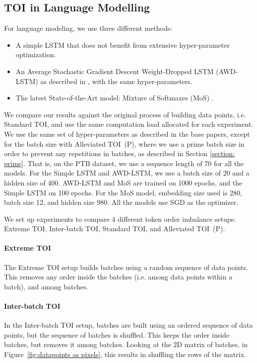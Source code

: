 \documentclass[11pt,a4paper]{article}
\begin{document}
\subsection{TOI in Language Modelling}

For language modeling, we use three different methods:
\begin{itemize}
    \item A simple LSTM that does not benefit from extensive hyper-parameter optimization.
    \item An Average Stochastic Gradient Descent Weight-Dropped LSTM (AWD-LSTM) as described in \citet{Merity:17}, with the same hyper-parameters.
    \item The latest State-of-the-Art model: Mixture of Softmaxes (MoS) \cite{Zhilin:17}.
\end{itemize} 
We compare our results against the original process of building data points, i.e. Standard TOI, and use the same computation load allocated for each experiment. We use the same set of hyper-parameters as described in the base papers, except for the batch size with Alleviated TOI~(P), where we use a prime batch size in order to prevent any repetitions in batches, as described in Section \ref{section: prime}. 
That is, on the PTB dataset, we use a sequence length of 70 for all the models. For the Simple LSTM and AWD-LSTM, we use a batch size of 20 and a hidden size of 400.
AWD-LSTM and MoS are trained on 1000 epochs, and the Simple LSTM on 100 epochs. For the MoS model, embedding size used is 280, batch size 12, and hidden size 980.
All the models use SGD as the optimizer.

We set up experiments to compare 4 different token order imbalance setups: Extreme TOI, Inter-batch TOI, Standard TOI, and Alleviated TOI~(P).

\paragraph{Extreme TOI} The Extreme TOI setup builds batches using a random sequence of data points. This removes any order inside the batches (i.e. among data points within a batch), and among batches. 

\paragraph{Inter-batch TOI} In the Inter-batch TOI setup, batches are built using an ordered sequence of data points, but the sequence of batches is shuffled. This keeps the order inside batches, but removes it among batches. Looking at the 2D matrix of batches, in Figure~\ref{fig:datapoints as pixels}, this results in shuffling the rows of the matrix.
\end{document}
